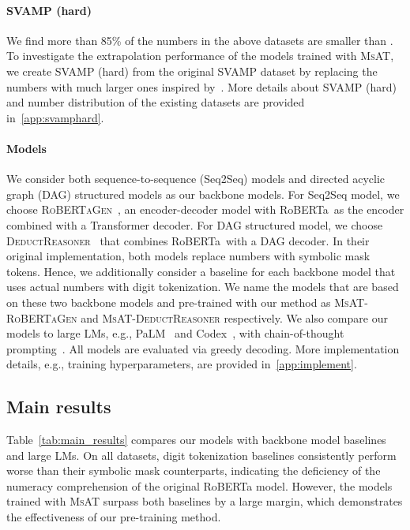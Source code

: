\documentclass[11pt]{article}
\newcommand{\ba}{}
\begin{document}
    
    \paragraph{SVAMP (hard)}
We find more than 85\% of the numbers in the above datasets are smaller than .
To investigate the extrapolation performance of the models trained with \textsc{MsAT},
        we create SVAMP (hard) from the original SVAMP dataset
        by replacing the numbers with much larger ones inspired by~\citet{gao2022pal}.
More details about SVAMP (hard) and number distribution of the existing datasets are provided in~\cref{app:svamphard}.

    
    \paragraph{Models}
We consider both sequence-to-sequence (Seq2Seq) models and directed acyclic graph (DAG) structured models as our backbone models.
For Seq2Seq model, we choose \textsc{RoBERTaGen}~\cite{lan2021mwptoolkit}, 
        an encoder-decoder model with RoBERTa\ba \ as the encoder combined with a Transformer decoder.
For DAG structured model, we choose \textsc{DeductReasoner}~\cite{jie2022deductreason} that combines RoBERTa\ba \ with a DAG decoder.
In their original implementation, both models replace numbers with symbolic mask tokens.
Hence, we additionally consider a baseline for each backbone model that uses actual numbers with digit tokenization.
We name the models that are based on these two backbone models and pre-trained with our method as 
        \textsc{MsAT-RoBERTaGen} and \textsc{MsAT-DeductReasoner} respectively.
We also compare our models to large LMs, e.g., PaLM~\cite{chowdhery2022palm} and Codex~\cite{chen2021codex}, with chain-of-thought prompting~\cite{wei2022cot}. 
All models are evaluated via greedy decoding.
More implementation details, e.g., training hyperparameters, are provided in~\cref{app:implement}.

    


  \subsection{Main results}


    Table~\ref{tab:main_results} compares our models with backbone model baselines and large LMs.
On all datasets, digit tokenization baselines consistently perform worse than their symbolic mask counterparts, 
      indicating the deficiency of the numeracy comprehension of the original RoBERTa model.
However, the models trained with \textsc{MsAT} surpass both baselines by a large margin,
      which demonstrates the effectiveness of our pre-training method.
\end{document}
